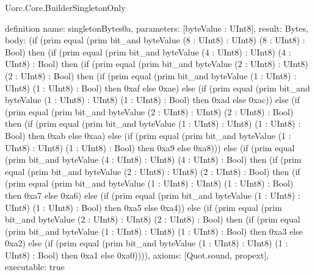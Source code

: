 \begin{lexlean}{Uorc.Core.BuilderSingletonOnly}
\begin{semanticmodule}
definition{
  name: singletonBytes0a,
  parameters: [byteValue : UInt8],
  result: Bytes,
  body: (if (prim equal (prim bit_and byteValue (8 : UInt8) : UInt8) (8 : UInt8) : Bool) then (if (prim equal (prim bit_and byteValue (4 : UInt8) : UInt8) (4 : UInt8) : Bool) then (if (prim equal (prim bit_and byteValue (2 : UInt8) : UInt8) (2 : UInt8) : Bool) then (if (prim equal (prim bit_and byteValue (1 : UInt8) : UInt8) (1 : UInt8) : Bool) then 0xaf else 0xae) else (if (prim equal (prim bit_and byteValue (1 : UInt8) : UInt8) (1 : UInt8) : Bool) then 0xad else 0xac)) else (if (prim equal (prim bit_and byteValue (2 : UInt8) : UInt8) (2 : UInt8) : Bool) then (if (prim equal (prim bit_and byteValue (1 : UInt8) : UInt8) (1 : UInt8) : Bool) then 0xab else 0xaa) else (if (prim equal (prim bit_and byteValue (1 : UInt8) : UInt8) (1 : UInt8) : Bool) then 0xa9 else 0xa8))) else (if (prim equal (prim bit_and byteValue (4 : UInt8) : UInt8) (4 : UInt8) : Bool) then (if (prim equal (prim bit_and byteValue (2 : UInt8) : UInt8) (2 : UInt8) : Bool) then (if (prim equal (prim bit_and byteValue (1 : UInt8) : UInt8) (1 : UInt8) : Bool) then 0xa7 else 0xa6) else (if (prim equal (prim bit_and byteValue (1 : UInt8) : UInt8) (1 : UInt8) : Bool) then 0xa5 else 0xa4)) else (if (prim equal (prim bit_and byteValue (2 : UInt8) : UInt8) (2 : UInt8) : Bool) then (if (prim equal (prim bit_and byteValue (1 : UInt8) : UInt8) (1 : UInt8) : Bool) then 0xa3 else 0xa2) else (if (prim equal (prim bit_and byteValue (1 : UInt8) : UInt8) (1 : UInt8) : Bool) then 0xa1 else 0xa0)))),
  axioms: [Quot.sound, propext],
  executable: true
}


\end{semanticmodule}
\end{lexlean}
